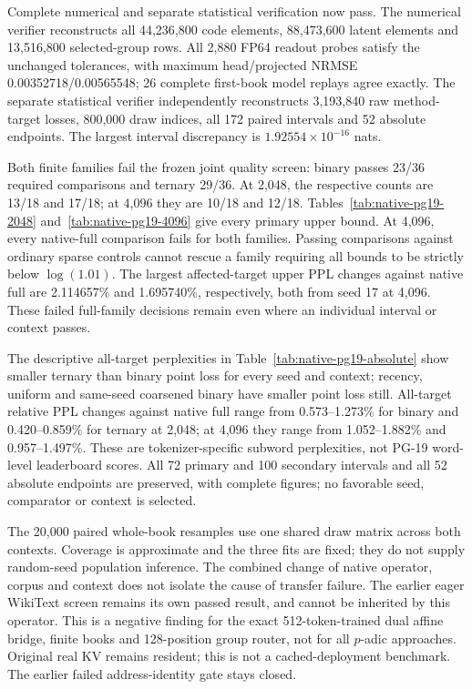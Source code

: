 \documentclass[11pt]{article}
\begin{document}
Complete numerical and separate statistical verification now pass. The numerical
verifier reconstructs all 44,236,800 code elements, 88,473,600 latent elements
and 13,516,800 selected-group rows. All 2,880 FP64 readout probes satisfy the
unchanged tolerances, with maximum head/projected NRMSE 0.00352718/0.00565548;
26 complete first-book model replays agree exactly. The separate statistical
verifier independently reconstructs 3,193,840 raw method-target losses,
800,000 draw indices, all 172 paired intervals and 52 absolute endpoints.
The largest interval discrepancy is \(1.92554\times10^{-16}\) nats.

Both finite families fail the frozen joint quality screen: binary passes
23/36 required comparisons and ternary 29/36. At 2,048, the respective counts
are 13/18 and 17/18; at 4,096 they are 10/18 and 12/18. Tables~\ref{tab:native-pg19-2048}
and~\ref{tab:native-pg19-4096} give every primary upper bound. At 4,096,
every native-full comparison fails for both families. Passing comparisons
against ordinary sparse controls cannot rescue a family requiring all bounds
to be strictly below \(\log(1.01)\). The largest affected-target upper PPL
changes against native full are 2.114657\% and 1.695740\%, respectively,
both from seed 17 at 4,096. These failed full-family decisions remain even
where an individual interval or context passes.

The descriptive all-target perplexities in Table~\ref{tab:native-pg19-absolute}
show smaller ternary than binary point loss for every seed and context;
recency, uniform and same-seed coarsened binary have smaller point loss still.
All-target relative PPL changes against native full range from 0.573--1.273\%
for binary and 0.420--0.859\% for ternary at 2,048; at 4,096 they range from
1.052--1.882\% and 0.957--1.497\%. These are tokenizer-specific subword
perplexities, not PG-19 word-level leaderboard scores. All 72 primary and
100 secondary intervals and all 52 absolute endpoints are preserved, with
complete figures; no favorable seed, comparator or context is selected.

The 20,000 paired whole-book resamples use one shared draw matrix across
both contexts. Coverage is approximate and the three fits are fixed; they do
not supply random-seed population inference. The combined change of native
operator, corpus and context does not isolate the cause of transfer failure.
The earlier eager WikiText screen remains its own passed result, and cannot
be inherited by this operator. This is a negative finding for the exact
512-token-trained dual affine bridge, finite books and 128-position group
router, not for all \(p\)-adic approaches. Original real KV remains resident;
this is not a cached-deployment benchmark. The earlier failed address-identity
gate stays closed.
\end{document}
